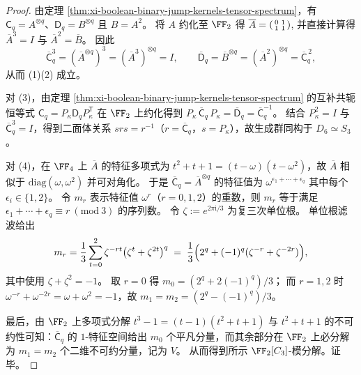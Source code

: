 \begin{proof}
由定理 \ref{thm:xi-boolean-binary-jump-kernels-tensor-spectrum}，有 \(\mathsf C_q=A^{\otimes q}\)、\(\mathsf D_q=B^{\otimes q}\) 且 \(B=A^2\)。
将 \(A\) 约化至 \(\FF_2\) 得
\(
\overline A=\begin{psmallmatrix}0&1\\1&1\end{psmallmatrix}
\),
并直接计算得 \(\overline A^3=I\) 与 \(\overline A^2=\overline B\)。
因此
\[
\overline{\mathsf C}_q^3=(\overline A^{\otimes q})^3=(\overline A^3)^{\otimes q}=I,
\qquad
\overline{\mathsf D}_q=\overline B^{\otimes q}=(\overline A^2)^{\otimes q}=\overline{\mathsf C}_q^{\,2},
\]
从而 (1)(2) 成立。
\par
对 (3)，由定理 \ref{thm:xi-boolean-binary-jump-kernels-tensor-spectrum} 的互补共轭恒等式
\(
\mathsf C_q=P_\kappa \mathsf D_q P_\kappa^{\mathsf T}
\)
在 \(\FF_2\) 上约化得到
\(
P_\kappa\,\overline{\mathsf C}_q\,P_\kappa=\overline{\mathsf D}_q=\overline{\mathsf C}_q^{-1}
\)。
结合 \(P_\kappa^2=I\) 与 \(\overline{\mathsf C}_q^3=I\)，得到二面体关系 \(srs=r^{-1}\)（\(r=\overline{\mathsf C}_q\)，\(s=P_\kappa\)），故生成群同构于 \(D_6\simeq S_3\)。
\par
对 (4)，在 \(\FF_4\) 上 \(\overline A\) 的特征多项式为 \(t^2+t+1=(t-\omega)(t-\omega^2)\)，故 \(\overline A\) 相似于 \(\mathrm{diag}(\omega,\omega^2)\) 并可对角化。
于是 \(\overline{\mathsf C}_q=\overline A^{\otimes q}\) 的特征值为
\(
\omega^{\epsilon_1+\cdots+\epsilon_q}
\)
其中每个 \(\epsilon_i\in\{1,2\}\)。
令 \(m_r\) 表示特征值 \(\omega^r\)（\(r=0,1,2\)）的重数，则 \(m_r\) 等于满足
\(
\epsilon_1+\cdots+\epsilon_q\equiv r\ (\mathrm{mod}\ 3)
\)
的序列数。
令 \(\zeta:=e^{2\pi\mathrm i/3}\) 为复三次单位根。
单位根滤波给出
\[
m_r=\frac{1}{3}\sum_{t=0}^{2}\zeta^{-rt}\bigl(\zeta^t+\zeta^{2t}\bigr)^q
\;=\;
\frac{1}{3}\Bigl(2^q+(-1)^q(\zeta^{-r}+\zeta^{-2r})\Bigr),
\]
其中使用 \(\zeta+\zeta^2=-1\)。
取 \(r=0\) 得 \(m_0=(2^q+2(-1)^q)/3\)；
而 \(r=1,2\) 时 \(\omega^{-r}+\omega^{-2r}=\omega+\omega^2=-1\)，故 \(m_1=m_2=(2^q-(-1)^q)/3\)。
\par
最后，由 \(\FF_2\) 上多项式分解
\(
t^3-1=(t-1)(t^2+t+1)
\)
与 \(t^2+t+1\) 的不可约性可知：\(\overline{\mathsf C}_q\) 的 \(1\)-特征空间给出 \(m_0\) 个平凡分量，而其余部分在 \(\FF_2\) 上必分解为 \(m_1=m_2\) 个二维不可约分量，记为 \(V\)。
从而得到所示 \(\FF_2[C_3]\)-模分解。证毕。
\end{proof}

